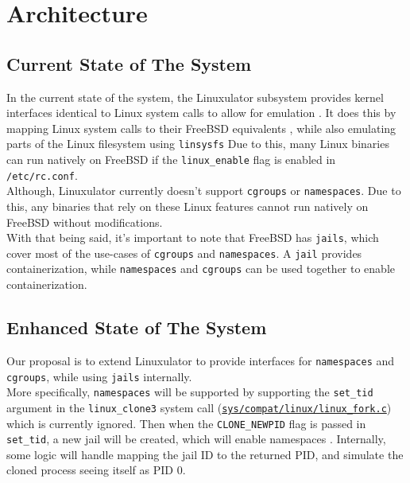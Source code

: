 \documentclass[12pt, dvipsnames, a4paper]{article}
\begin{document}
\section{Architecture}
\subsection{Current State of The System}

In the current state of the system, the Linuxulator subsystem provides kernel
interfaces identical to Linux system calls to allow for emulation \cite{linuxbinarycompat}.
It does this by mapping Linux system calls to their FreeBSD equivalents \cite{linuxulator},
while also emulating parts of the Linux filesystem using \texttt{linsysfs} \cite{linsysfs}
Due to this, many Linux binaries can run natively on FreeBSD if the
\texttt{linux\_enable} flag is enabled in \texttt{/etc/rc.conf}.\\

Although, Linuxulator currently doesn't support \texttt{cgroups} or \texttt{namespaces}.
Due to this, any binaries that rely on these Linux features cannot run
natively on FreeBSD without modifications.\\

With that being said, it's important to note that FreeBSD has \texttt{jails},
which cover most of the use-cases of \texttt{cgroups} and \texttt{namespaces}.
A \texttt{jail} provides containerization, while \texttt{namespaces} and \texttt{cgroups}
can be used together to enable containerization.

\subsection{Enhanced State of The System}

Our proposal is to extend Linuxulator to provide interfaces for \texttt{namespaces}
and \texttt{cgroups}, while using \texttt{jails} internally.\\

More specifically, \texttt{namespaces} will be supported by supporting
the \texttt{set\_tid} argument in the \texttt{linux\_clone3} system call (\href{https://github.com/freebsd/freebsd-src/blob/953efa5b200f060564a090ab71b3d7f614a35e3f/sys/compat/linux/linux_fork.c#L398}{\texttt{sys/compat/linux/linux\_fork.c}})
which is currently ignored. Then when the \texttt{CLONE\_NEWPID} flag is passed in
\texttt{set\_tid}, a new jail will be created, which will enable
namespaces \cite{clone}. Internally, some logic will handle mapping the jail ID to the
returned PID, and simulate the cloned process seeing itself as PID 0.\\
\end{document}
